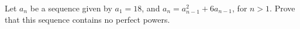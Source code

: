 Let $a_n$ be a sequence given by $a_1 = 18$, and $a_n = a_{n-1}^2+6a_{n-1}$, for $n>1$. Prove that this sequence contains no perfect powers.